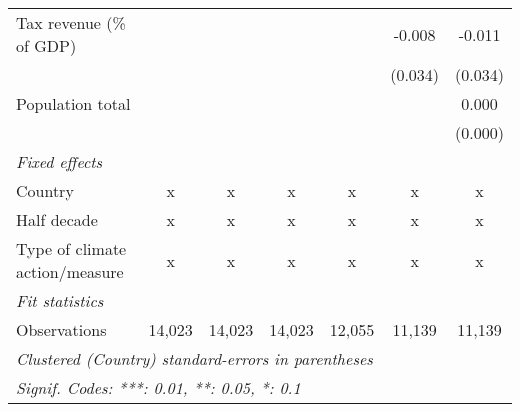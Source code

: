 \begin{tabular}{lcccccc}
   Tax revenue (\% of GDP)                                       &         &         &         &         & -0.008      & -0.011\\   
                                                                 &         &         &         &         & (0.034)     & (0.034)\\   
   Population total                                              &         &         &         &         &             & 0.000\\   
                                                                 &         &         &         &         &             & (0.000)\\   
   \emph{Fixed effects}\\
   Country                                                       & x       & x       & x       & x       & x           & x\\  
   Half decade                                                   & x       & x       & x       & x       & x           & x\\  
   Type of climate action/measure                                & x       & x       & x       & x       & x           & x\\  
   \midrule \emph{Fit statistics}\\
   Observations                                                  & 14,023  & 14,023  & 14,023  & 12,055  & 11,139      & 11,139\\  
   \midrule
   \multicolumn{7}{l}{\emph{Clustered (Country) standard-errors in parentheses}}\\
   \multicolumn{7}{l}{\emph{Signif. Codes: ***: 0.01, **: 0.05, *: 0.1}}\\
\end{tabular}
\par\endgroup


